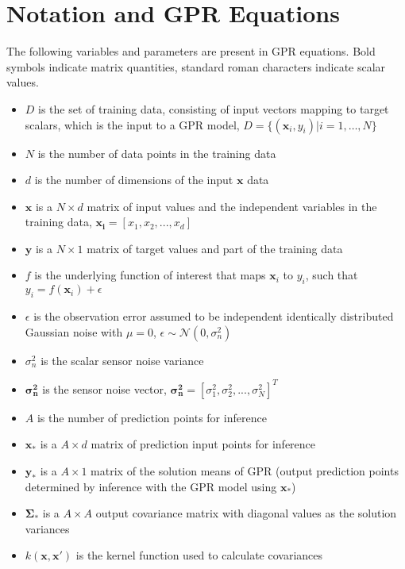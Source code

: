 \chapter{Notation and GPR Equations} 

The following variables and parameters are present in GPR equations. Bold symbols indicate matrix quantities, standard roman characters indicate scalar values. 
\begin{itemize}[noitemsep, nolistsep]
    \item $D$ is the set of training data, consisting of input vectors mapping to target scalars, which is the input to a GPR model, $D = \{(\boldsymbol{x}_i,y_i)|i=1,\ldots,N\}$
    \item $N$ is the number of data points in the training data
    \item $d$ is the number of dimensions of the input $\boldsymbol{x}$ data
    \item $\boldsymbol{x}$ is a $N \times d$ matrix of input values and the independent variables in the training data, $\boldsymbol{x_i} = [{x}_1, {x}_2, ... , {x}_d]$
    \item $\boldsymbol{y}$ is a $N \times 1$ matrix of target values and part of the training data
    \item $f$ is the underlying function of interest that maps $\boldsymbol{x}_i$ to ${y}_i$, such that $y_i = f(\boldsymbol{x}_i) + \epsilon$
    \item $\epsilon$ is the observation error assumed to be independent identically distributed Gaussian noise with $\mu = 0$, $\epsilon \sim \mathcal{N}(0,\sigma_n^{2})$
    \item $\sigma_n^2$ is the scalar sensor noise variance
    \item $\boldsymbol{\sigma_n^2}$ is the sensor noise vector, $\boldsymbol{\sigma_n^2} = [\sigma_1^2, \sigma_2^2, ... , \sigma_N^2]^T$
    \item $A$ is the number of prediction points for inference
    \item $\boldsymbol{x}_{\ast}$ is a $A \times d$ matrix of prediction input points for inference
    \item $\boldsymbol{y}_{\ast}$ is a $A \times 1$ matrix of the solution means of GPR (output prediction points determined by inference with the GPR model using $\boldsymbol{x}_{\ast}$)
    \item $\boldsymbol{\Sigma}_{\ast}$ is a $A \times A$ output covariance matrix with diagonal values as the solution variances 
    \item $k(\boldsymbol{x},\boldsymbol{x'})$ is the kernel function used to calculate covariances

\end{itemize}
